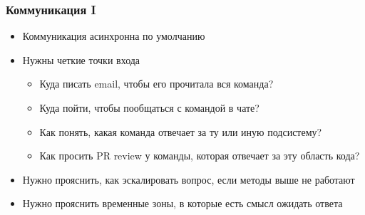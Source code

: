 \documentclass[10pt,pdf,utf8,aspectratio=169,xcolor=dvipsnames,x11names,center]{beamer}
\begin{document}
\begin{frame}
  \frametitle{Коммуникация I}

  \begin{itemize}
  \item Коммуникация асинхронна по умолчанию
  \item Нужны четкие точки входа
    \begin{itemize}[<.(1)->]
    \item Куда писать email, чтобы его прочитала вся команда?
    \item Куда пойти, чтобы пообщаться с командой в чате?
    \item Как понять, какая команда отвечает за ту или иную подсистему?
    \item Как просить PR review у команды, которая отвечает за эту область кода?
    \end{itemize}
  \item Нужно прояснить, как эскалировать вопрос, если методы выше не работают
  \item Нужно прояснить временные зоны, в которые есть смысл ожидать ответа
  \end{itemize}


\end{frame}
\end{document}
